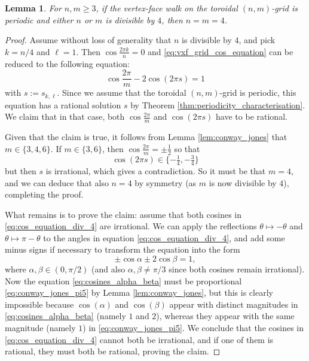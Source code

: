 \documentclass{article}
\newtheorem{lemma}[theorem]{Lemma}
\numberwithin{equation}{section}
\begin{document}
\begin{lemma}
\label{lem:periodic_implies_4_4grid}
For $n,m \geq 3$, if the vertex-face walk on the toroidal $(n,m)$-grid is periodic and either $n$ or $m$ is divisible by $4$, then $n = m = 4$.
\end{lemma}
\begin{proof}
Assume without loss of generality that $n$ is divisible by $4$, and pick $k = n/4$ and $\ell = 1$. Then $\cos\frac{2\pi k}{n} = 0 $ and \eqref{eq:vxf_grid_cos_equation} can be reduced to the following equation:
\begin{equation}
\label{eq:cos_equation_div_4}
\cos\frac{2\pi}{m} - 2\cos(2\pi s) = 1 
\end{equation}
with $s := s_{k,\ell}$. Since we assume that the toroidal $(n,m)$-grid is periodic, this equation has a rational solution $s$ by Theorem \ref{thm:periodicity_characterisation}. We claim that in that case, both $\cos\frac{2\pi}{m}$ and $\cos(2\pi s)$ have to be rational.

Given that the claim is true, it follows from Lemma \ref{lem:conway_jones} that $m \in \{3,4,6\}$. If $m \in \{3,6\}$, then $\cos\frac{2\pi}{m} = \pm\frac{1}{2}$ so that
\[
\cos(2\pi s) \in \{ -\tfrac{1}{4}, -\tfrac{3}{4}\}  
\]
but then $s$ is irrational, which gives a contradiction. So it must be that $m = 4$, and we can deduce that also $n = 4$ by symmetry (as $m$ is now divisible by $4$), completing the proof.

What remains is to prove the claim: assume that both cosines in \eqref{eq:cos_equation_div_4} are irrational. We can apply the reflections $\theta \mapsto -\theta$ and $\theta \mapsto \pi - \theta$ to the angles in equation \eqref{eq:cos_equation_div_4}, and add some minus signs if necessary to transform the equation into the form
\begin{equation}
\label{eq:cosines_alpha_beta}
\pm \cos\alpha \pm 2\cos\beta = 1,
\end{equation}
where $\alpha,\beta \in (0,\pi/2)$ (and also $\alpha,\beta \neq \pi/3$ since both cosines remain irrational). Now the equation \eqref{eq:cosines_alpha_beta} must be proportional \eqref{eq:conway_jones_pi5} by Lemma \ref{lem:conway_jones}, but this is clearly impossible because $\cos(\alpha)$ and $\cos(\beta)$ appear with distinct magnitudes in \eqref{eq:cosines_alpha_beta} (namely $1$ and $2$), whereas they appear with the same magnitude (namely $1$) in \eqref{eq:conway_jones_pi5}. We conclude that the cosines in \eqref{eq:cos_equation_div_4} cannot both be irrational, and if one of them is rational, they must both be rational, proving the claim.
\end{proof}
\end{document}
